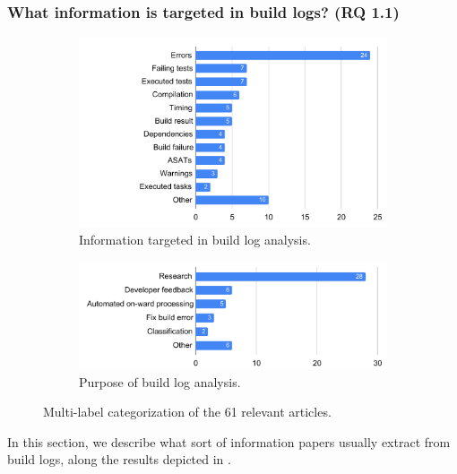 \subsubsection{What information is targeted in build logs? (RQ 1.1)}
\label{sec:rq11}
\begin{figure}
\centering
\begin{subfigure}[t]{\columnwidth}
		\centering
		\includegraphics[width=\columnwidth,
		clip]{img/lit-sur/info_target.pdf}
		\caption{Information targeted in build log analysis.}
		\label{fig:litsur:info_target}

\end{subfigure}\hspace{\fill}
\begin{subfigure}[t]{\columnwidth}
		\centering
				\includegraphics[width=\columnwidth,
				clip]{img/lit-sur/use.pdf}
		\caption{Purpose of build log analysis.}
		\label{fig:litsur:use}

\end{subfigure}

\caption{Multi-label categorization of the 61 relevant articles.}
\label{fig:litsur_r}
\end{figure}

In this section, we describe what sort of information papers usually
extract from build logs, along the results depicted
in .

